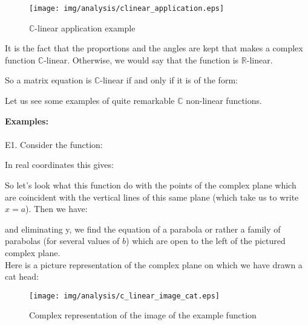 \begin{figure}[H]
\centering
\texttt{[image: img/analysis/clinear\_application.eps]}
\caption{$\mathbb{C}$-linear application example}
\end{figure}

It is the fact that the proportions and the angles are kept that makes a complex function $\mathbb{C}$-linear. Otherwise, we would say that the function is $\mathbb{R}$-linear.

So a matrix equation is $\mathbb{C}$-linear if and only if it is of the form:
	
Let us see some examples of quite remarkable $\mathbb{C}$ non-linear functions.

	\begin{tcolorbox}[colframe=black,colback=white,sharp corners]
\textbf{{\Large {}}Examples:}\\\\
E1. Consider the function:
	
In real coordinates this gives:
		
So let's look what this function do with the points of the complex plane which are coincident with the vertical lines of this same plane (which take us to write $x=a$). Then we have:
	
	and eliminating y, we find the equation of a parabola or rather a family of  parabolas (for several values of $b$) which are open to the left of the pictured complex plane.\\

	Here is a picture representation of the complex plane on which we have drawn a cat head:
	\begin{figure}[H]
		\begin{center}
			\texttt{[image: img/analysis/c\_linear\_image\_cat.eps]}
		\end{center}	
		\caption{Complex representation of the image of the example function}
	\end{figure}
	\end{tcolorbox}

